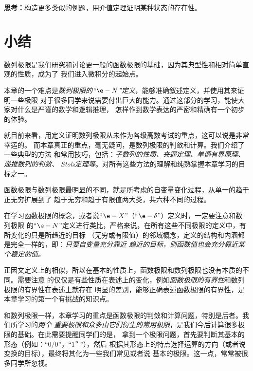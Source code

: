 {\bf 思考：}构造更多类似的例题，用介值定理证明某种状态的存在性。

% 

\section*{小结}

数列极限是我们研究和讨论更一般的函数极限的基础，因为其典型性和相对简单直观的性质，成为了
我们进入微积分的起始点。

本章的一个难点是{\it 数列极限的“$\e-N$”定义}，能够准确叙述定义，并使用其来证明一些极限
对于很多同学来说需要付出巨大的能力。通过这部分的学习，能使大家对什么是严谨的数学和逻辑推理，
怎样作到数学表达的严密和精确有一个初步的体验。

就目前来看，用定义证明数列极限从未作为各级高数考试的重点，这可以说是非常幸运的。
而本章真正的重点，毫无疑问，是数列极限的判敛和计算。我们介绍了一些典型的方法
和常用技巧，包括：{\it 子数列的性质、夹逼定理、单调有界原理、递推数列的判敛、
Stolz定理等}。对所有这些方法的理解和纯熟掌握本章学习的目标之一。

函数极限与数列极限最明显的不同，就是所考虑的自变量变化过程，从单一的趋于正无穷扩展到了
趋于无穷和趋于有限值两大类，共六种不同的过程。

在学习函数极限的概念，或者说“$\e-X$”（“$\e-\delta$”）定义时，一定要注意和数列极限
的“$\e-N$”定义进行类比，严格来说，在所有这些不同极限的定义中，有所变化的只是所趋近的目标
（无穷或有限值）的邻域概念，定义的结构和内涵都是完全一样的，即：{\it 只要自变量充分靠近
趋近的目标，则函数值也会充分靠近某个稳定的值。}

正因文定义上的相似，所以在基本的性质上，函数极限和数列极限也没有本质的不同。需要注意
的仅仅是有些性质在表述上的变化，例如{\it 函数极限的有界性}和数列极限的有界性在表述上就存在
明显的差别，能够正确表述函数极限的有界性，是本章学习的第一个有挑战的知识点。

和数列极限一样，本章学习的重点是函数极限的判敛和计算问题，特别是后者。我们所学习的{\it 两个
重要极限和众多由它们衍生的常用极限}，是我们今后计算很多极限的基础。在此需要提醒同学们的是，
拿到一个极限问题，首先要判断其基本的形态（例如：“$0/0$”，“$1^{\infty}$”），然后
根据其形态上的特点选择运算的方向（或者说变换的目标），最终将其化为一些我们常见或者说
基本的极限。这一点，常常被很多同学所忽视。


